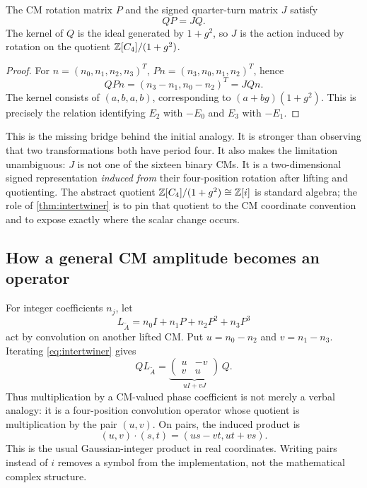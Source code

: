 \begin{theorem}\label{thm:intertwiner}
The CM rotation matrix $P$ and the signed quarter-turn matrix $J$ satisfy
\begin{equation}\label{eq:intertwiner}
 QP=JQ.
\end{equation}
The kernel of $Q$ is the ideal generated by $1+g^2$, so $J$ is the action induced by rotation on the quotient $\mathbb Z[C_4]/(1+g^2)$.
\end{theorem}
\begin{proof}
For $n=(n_0,n_1,n_2,n_3)^T$, $Pn=(n_3,n_0,n_1,n_2)^T$, hence
\begin{equation}
 QPn=(n_3-n_1,n_0-n_2)^T=JQn.
\end{equation}
The kernel consists of $(a,b,a,b)$, corresponding to $(a+bg)(1+g^2)$. This is precisely the relation identifying $E_2$ with $-E_0$ and $E_3$ with $-E_1$.
\end{proof}
This is the missing bridge behind the initial analogy. It is stronger than observing that two transformations both have period four. It also makes the limitation unambiguous: $J$ is not one of the sixteen binary CMs. It is a two-dimensional signed representation \emph{induced from} their four-position rotation after lifting and quotienting.  The abstract quotient $\mathbb Z[C_4]/(1+g^2)\cong\mathbb Z[i]$ is standard algebra; the role of \cref{thm:intertwiner} is to pin that quotient to the CM coordinate convention and to expose exactly where the scalar change occurs.

\subsection{How a general CM amplitude becomes an operator}
For integer coefficients $n_j$, let
\begin{equation}
 L_{\widetilde A}=n_0I+n_1P+n_2P^2+n_3P^3
\end{equation}
act by convolution on another lifted CM. Put $u=n_0-n_2$ and $v=n_1-n_3$. Iterating \cref{eq:intertwiner} gives
\begin{equation}\label{eq:operatorbridge}
 QL_{\widetilde A}=
 \underbrace{\begin{pmatrix}u&-v\\v&u\end{pmatrix}}_{uI+vJ}\,Q.
\end{equation}
Thus multiplication by a CM-valued phase coefficient is not merely a verbal analogy: it is a four-position convolution operator whose quotient is multiplication by the pair $(u,v)$. On pairs, the induced product is
\begin{equation}
 (u,v)\cdot(s,t)=(us-vt,ut+vs).
\end{equation}
This is the usual Gaussian-integer product in real coordinates. Writing pairs instead of $i$ removes a symbol from the implementation, not the mathematical complex structure.

